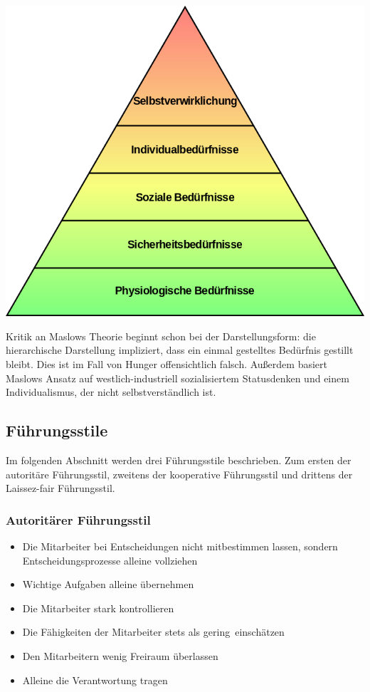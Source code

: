 \includegraphics[scale=0.3]{pictures/lf02-pic/lf02-maslow.png}

Kritik an Maslows Theorie beginnt schon bei der Darstellungsform: die hierarchische Darstellung impliziert, dass ein einmal gestelltes Bedürfnis gestillt bleibt. Dies ist im Fall von Hunger offensichtlich falsch. Außerdem basiert Maslows Ansatz auf westlich-industriell sozialisiertem Statusdenken und einem Individualismus, der nicht selbstverständlich ist.


\subsection{Führungsstile}

Im folgenden Abschnitt werden drei Führungsstile beschrieben. Zum ersten der autoritäre Führungsstil, zweitens der kooperative Führungsstil und drittens der Laissez-fair Führungsstil.

\subsubsection{Autoritärer Führungsstil}
\begin{itemize}
	\item Die Mitarbeiter bei Entscheidungen nicht mitbestimmen lassen, sondern Entscheidungsprozesse alleine vollziehen
	\item Wichtige Aufgaben alleine übernehmen
	\item Die Mitarbeiter stark kontrollieren
	\item Die Fähigkeiten der Mitarbeiter stets als \ql gering\qr\ einschätzen
	\item Den Mitarbeitern wenig Freiraum überlassen
	\item Alleine die Verantwortung tragen
\end{itemize}

